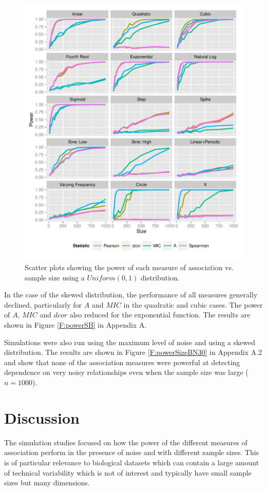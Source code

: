 \documentclass[a4paper, 12pt]{report}
\begin{document}
\begin{figure}[H]
\begin{center}
\includegraphics[width=\textwidth]{powerSizeUN10.pdf}
\caption{Scatter plots showing the power of each measure of association vs. sample size using a $Uniform(0,1)$ distribution.} 
\label{F:powerSizeUN10}
\end{center}
\end{figure}

In the case of the skewed distribution, the performance of all measures generally declined, particularly for $A$ and $MIC$ in the quadratic and cubic cases. The power of $A$, $MIC$ and $dcor$ also reduced for the exponential function. The results are shown in Figure \ref{F:powerSB} in Appendix A.

Simulations were also run using the maximum level of noise and using a skewed distribution. The results are shown in Figure \ref{F:powerSizeBN30} in Appendix A.2 and show that none of the association measures were powerful at detecting dependence on very noisy relationships even when the sample size was large ($n=1000$).

\section{Discussion}
The simulation studies focused on how the power of the different measures of association perform in the presence of noise and with different sample sizes. This is of particular relevance to biological datasets which can contain a large amount of technical variability which is not of interest and typically have small sample sizes but many dimensions. 
\end{document}
